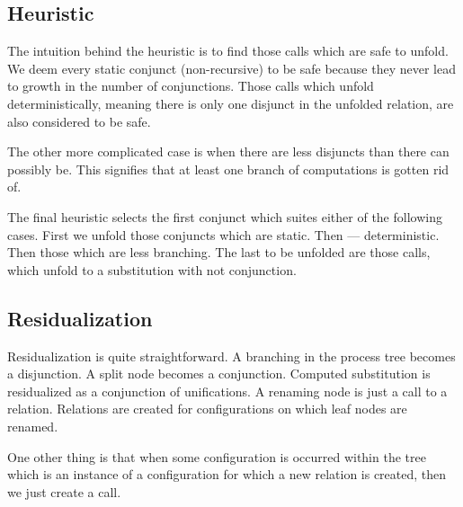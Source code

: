 \subsection{Heuristic}

The intuition behind the heuristic is to find those calls which are safe to unfold.
We deem every static conjunct (non-recursive) to be safe because they never lead to growth in the number of conjunctions.
Those calls which unfold deterministically, meaning there is only one disjunct in the unfolded relation, are also considered to be safe.

The other more complicated case is when there are less disjuncts than there can possibly be.
This signifies that at least one branch of computations is gotten rid of.

The final heuristic selects the first conjunct which suites either of the following cases.
First we unfold those conjuncts which are static.
Then --- deterministic.
Then those which are less branching.
The last to be unfolded are those calls, which unfold to a substitution with not conjunction.

\subsection{Residualization}

Residualization is quite straightforward.
A branching in the process tree becomes a disjunction.
A split node becomes a conjunction.
Computed substitution is residualized as a conjunction of unifications.
A renaming node is just a call to a relation.
Relations are created for configurations on which leaf nodes are renamed.

One other thing is that when some configuration is occurred within the tree which is an instance of a configuration for which a new relation is created, then we just create a call.
